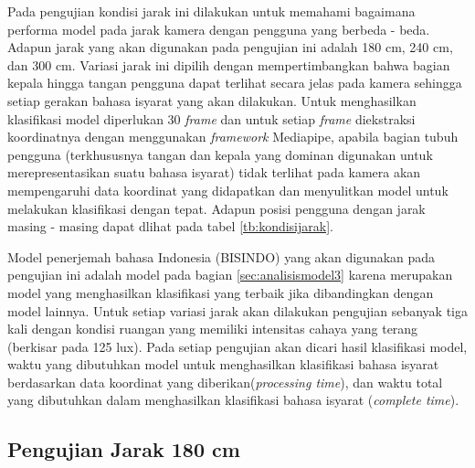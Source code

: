 Pada pengujian kondisi jarak ini dilakukan untuk memahami bagaimana performa model pada jarak kamera dengan pengguna yang berbeda - beda. Adapun jarak yang akan digunakan pada pengujian ini adalah 180 cm, 240 cm, dan 300 cm. Variasi jarak ini dipilih dengan mempertimbangkan bahwa bagian kepala hingga tangan pengguna dapat terlihat secara jelas pada kamera sehingga setiap gerakan bahasa isyarat yang akan dilakukan. Untuk menghasilkan klasifikasi model diperlukan 30 \emph{frame} dan untuk setiap \emph{frame} diekstraksi koordinatnya dengan menggunakan \emph{framework} Mediapipe, apabila bagian tubuh pengguna (terkhususnya tangan dan kepala yang dominan digunakan untuk merepresentasikan suatu bahasa isyarat) tidak terlihat pada kamera akan mempengaruhi data koordinat yang didapatkan dan menyulitkan model untuk melakukan klasifikasi dengan tepat. Adapun posisi pengguna dengan jarak masing - masing dapat dlihat pada tabel \ref{tb:kondisijarak}. 

Model penerjemah bahasa Indonesia (BISINDO) yang akan digunakan pada pengujian ini adalah model pada bagian \ref{sec:analisismodel3} karena merupakan model yang menghasilkan klasifikasi yang terbaik jika dibandingkan dengan model lainnya. Untuk setiap variasi jarak akan dilakukan pengujian sebanyak tiga kali dengan kondisi ruangan yang memiliki intensitas cahaya yang terang (berkisar pada 125 lux). Pada setiap pengujian akan dicari hasil klasifikasi model, waktu yang dibutuhkan model untuk menghasilkan klasifikasi bahasa isyarat berdasarkan data koordinat yang diberikan(\emph{processing time}), dan waktu total yang dibutuhkan dalam menghasilkan klasifikasi bahasa isyarat (\emph{complete time}).  

\subsection{Pengujian Jarak 180 cm}
\label{sec:analisisjarak1}

